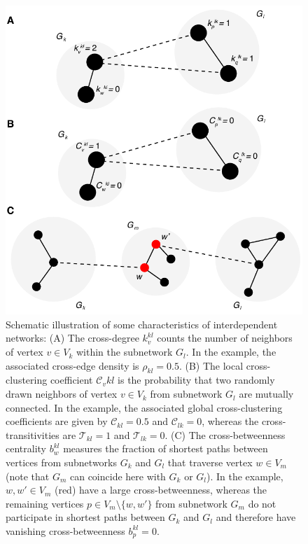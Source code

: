 \documentclass[graybox]{svmult}
\begin{document}
\begin{figure}
\centering
\includegraphics[width=\columnwidth]{cross_measures_schematic.pdf} 
\caption{Schematic illustration of some characteristics of interdependent networks: (A) The cross-degree $k_v^{kl}$ counts the number of neighbors of vertex $v\in V_k$ within the subnetwork $G_l$. In the example, the associated cross-edge density is $\rho_{kl}=0.5$. (B) The local cross-clustering coefficient $\mathcal{C}_v{kl}$ is the probability that two randomly drawn neighbors of vertex $v\in V_k$ from subnetwork $G_l$ are mutually connected. In the example, the associated global cross-clustering coefficients are given by $\mathcal{C}_{kl}=0.5$ and $\mathcal{C}_{lk}=0$, whereas the cross-transitivities are $\mathcal{T}_{kl}=1$ and $\mathcal{T}_{lk}=0$. (C) The cross-betweenness centrality $b_w^{kl}$ measures the fraction of shortest paths between vertices from subnetworks $G_k$ and $G_l$ that traverse vertex $w\in V_m$ (note that $G_m$ can coincide here with $G_k$ or $G_l$). In the example, $w,w'\in V_m$ (red) have a large cross-betweenness, whereas the remaining vertices $p\in V_m\setminus\{w,w'\}$ from subnetwork $G_m$ do not participate in shortest paths between $G_k$ and $G_l$ and therefore have vanishing cross-betweenness $b_p^{kl}=0$.}
\label{fig:interacting_measures}
\end{figure}
\end{document}
